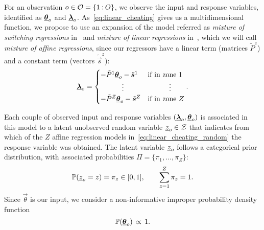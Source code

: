 \documentclass{ifacconf}  %
\begin{document}
For an observation ${o\in\mathcal{O}=\{1\mathbin{:}O\}}$, we observe the input and response variables, identified as  ${\underline{\boldsymbol{\theta}}_{o}}$ and ${\underline{\boldsymbol{\lambda}}_{o}}$.
As~\eqref{eq:linear_cheating} gives us a multidimensional \pwa{} function, we propose to use an expansion of the model referred as \emph{mixture of switching regressions} in~\cite{QuandtRamsey1978} and \emph{mixture of linear regressions} in~\cite{FariaSoromenho2010}, which we will call \emph{mixture of affine regressions}, since our regressors have a linear term (matrices $\tilde{P}^{z}$) and a constant term (vectors $\tilde{\vec{s}}^{z}$):
\begin{equation}
  \label{eq:linear_cheating_random}
  {\underline{\boldsymbol{\lambda}}}_{o}=
  \begin{cases}
    -\tilde{P}^{1}{\underline{\boldsymbol{\theta}}}_{o}-\tilde{\boldsymbol{s}}^{1}&\text{if in zone } 1\\
    \qquad\quad \vdots&\qquad\quad \vdots\\
    -\tilde{P}^{Z}{\underline{\boldsymbol{\theta}}}_{o}-\tilde{\boldsymbol{s}}^{Z}&\text{if in zone } Z\\
  \end{cases}.
\end{equation}

Each couple of observed input and response variables $(    {\underline{\boldsymbol{\lambda}}}_{o}, {\underline{\boldsymbol{\theta}}}_{o})$ is associated in this model to a latent unobserved random variable ${\underline{z}_{o}\in\mathcal{Z}}$ that indicates from which of the $Z$ affine regression models in~\eqref{eq:linear_cheating_random} the response variable was obtained.
The latent variable $\underline{z}_{o}$ follows a categorical prior distribution, with associated probabilities ${\Pi=\{\pi_{1},\dots,\pi_{Z}\}}$:
   \begin{equation}
     \label{eq:prob_zo_equal_z}
\mathbb{P}(\underline{z}_{o}=z)=\pi_{z} \in [0,1], \qquad \sum_{z=1}^{Z} \pi_{z} = 1.
\end{equation}
Since $\vec{\theta}$ is our input,
we consider a non-informative improper probability density function~\cite{ChristensenEtAl2010}
\begin{equation}
  \label{eq:theta_almost_surely}
  \mathbb{P}({\underline{\boldsymbol{\theta}}}_{o}) \,\propto \,1.
\end{equation}
\end{document}
